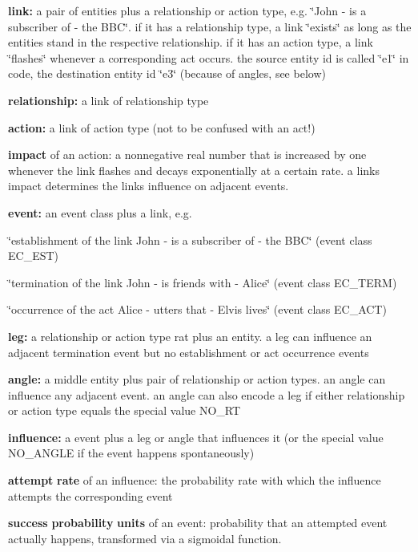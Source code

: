 \begin{DoxyItemize}
\item {\bfseries link\+:} a pair of entities plus a relationship or action type, e.\+g. \char`\"{}\+John -\/ is a subscriber of -\/ the B\+B\+C\char`\"{}. if it has a relationship type, a link \char`\"{}exists\char`\"{} as long as the entities stand in the respective relationship. if it has an action type, a link \char`\"{}flashes\char`\"{} whenever a corresponding act occurs. the source entity id is called \char`\"{}e1\char`\"{} in code, the destination entity id \char`\"{}e3\char`\"{} (because of angles, see below)
\item {\bfseries relationship\+:} a link of relationship type
\item {\bfseries action\+:} a link of action type (not to be confused with an act!)
\item {\bfseries impact} of an action\+: a nonnegative real number that is increased by one whenever the link flashes and decays exponentially at a certain rate. a link\textquotesingle{}s impact determines the link\textquotesingle{}s influence on adjacent events.
\item {\bfseries event\+:} an event class plus a link, e.\+g.
\begin{DoxyItemize}
\item \char`\"{}establishment of the link \textquotesingle{}\+John -\/ is a subscriber of -\/ the B\+B\+C\textquotesingle{}\char`\"{} (event class E\+C\+\_\+\+E\+ST)
\item \char`\"{}termination of the link \textquotesingle{}\+John -\/ is friends with -\/ Alice\textquotesingle{}\char`\"{} (event class E\+C\+\_\+\+T\+E\+RM)
\item \char`\"{}occurrence of the act \textquotesingle{}\+Alice -\/ utters that -\/ Elvis lives\textquotesingle{}\char`\"{} (event class E\+C\+\_\+\+A\+CT)
\end{DoxyItemize}
\item {\bfseries leg\+:} a relationship or action type rat plus an entity. a leg can influence an adjacent termination event but no establishment or act occurrence events
\item {\bfseries angle\+:} a middle entity plus pair of relationship or action types. an angle can influence any adjacent event. an angle can also encode a leg if either relationship or action type equals the special value N\+O\+\_\+\+RT
\item {\bfseries influence\+:} a event plus a leg or angle that influences it (or the special value N\+O\+\_\+\+A\+N\+G\+LE if the event happens spontaneously)
\item {\bfseries attempt} {\bfseries rate} of an influence\+: the probability rate with which the influence attempts the corresponding event
\item {\bfseries success} {\bfseries probability} {\bfseries units} of an event\+: probability that an attempted event actually happens, transformed via a sigmoidal function.
\end{DoxyItemize}

